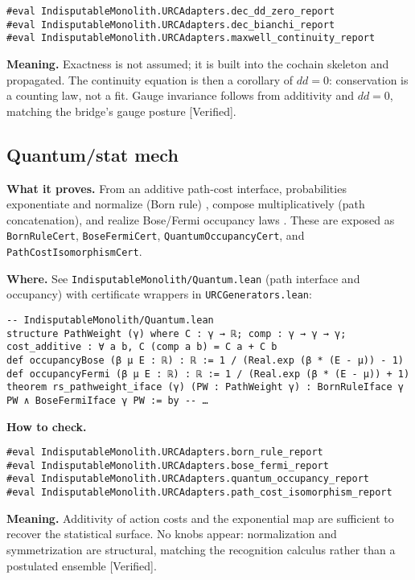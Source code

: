 \documentclass[11pt,a4paper,twoside]{article}
\numberwithin{equation}{section}
\theoremstyle{customthm}
\theoremstyle{customdef}
\theoremstyle{customrem}
\begin{document}
\begin{lstlisting}
#eval IndisputableMonolith.URCAdapters.dec_dd_zero_report
#eval IndisputableMonolith.URCAdapters.dec_bianchi_report
#eval IndisputableMonolith.URCAdapters.maxwell_continuity_report
\end{lstlisting}

\textbf{Meaning.} Exactness is not assumed; it is built into the cochain skeleton and propagated. The continuity equation is then a corollary of \(dd=0\): conservation is a counting law, not a fit. Gauge invariance follows from additivity and \(dd=0\), matching the bridge's gauge posture [Verified].

\subsection{Quantum/stat mech}

\textbf{What it proves.} From an additive path-cost interface, probabilities exponentiate and normalize (Born rule) \citep{Born1926,FeynmanHibbs1965}, compose multiplicatively (path concatenation), and realize Bose/Fermi occupancy laws \citep{Bose1924,Einstein1925,Dirac1926}. These are exposed as \texttt{BornRuleCert}, \texttt{BoseFermiCert}, \texttt{QuantumOccupancyCert}, and \texttt{PathCostIsomorphismCert}.

\textbf{Where.} See \texttt{IndisputableMonolith/Quantum.lean} (path interface and occupancy) with certificate wrappers in \texttt{URCGenerators.lean}:

\begin{lstlisting}
-- IndisputableMonolith/Quantum.lean
structure PathWeight (γ) where C : γ → ℝ; comp : γ → γ → γ; cost_additive : ∀ a b, C (comp a b) = C a + C b
def occupancyBose (β μ E : ℝ) : ℝ := 1 / (Real.exp (β * (E - μ)) - 1)
def occupancyFermi (β μ E : ℝ) : ℝ := 1 / (Real.exp (β * (E - μ)) + 1)
theorem rs_pathweight_iface (γ) (PW : PathWeight γ) : BornRuleIface γ PW ∧ BoseFermiIface γ PW := by -- …
\end{lstlisting}

\textbf{How to check.}

\begin{lstlisting}
#eval IndisputableMonolith.URCAdapters.born_rule_report
#eval IndisputableMonolith.URCAdapters.bose_fermi_report
#eval IndisputableMonolith.URCAdapters.quantum_occupancy_report
#eval IndisputableMonolith.URCAdapters.path_cost_isomorphism_report
\end{lstlisting}

\textbf{Meaning.} Additivity of action costs and the exponential map are sufficient to recover the statistical surface. No knobs appear: normalization and symmetrization are structural, matching the recognition calculus rather than a postulated ensemble [Verified].
\end{document}
